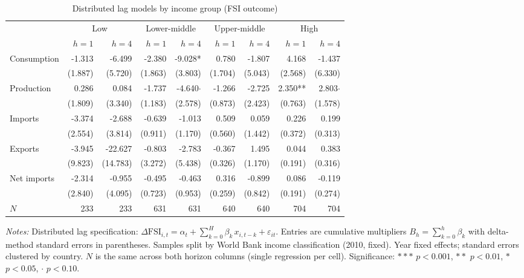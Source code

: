 
\begin{table}[htbp]
\centering
\caption{Distributed lag models by income group (FSI outcome)}
\label{tab:income-dl}
\begin{threeparttable}
\small
\begin{tabular}{l rr rr rr rr}
\toprule
 & \multicolumn{2}{c}{Low} & \multicolumn{2}{c}{Lower-middle} & \multicolumn{2}{c}{Upper-middle} & \multicolumn{2}{c}{High} \\
\cmidrule(lr){2-3} \cmidrule(lr){4-5} \cmidrule(lr){6-7} \cmidrule(lr){8-9}
 & $h=1$ & $h=4$ & $h=1$ & $h=4$ & $h=1$ & $h=4$ & $h=1$ & $h=4$ \\
\midrule
Consumption & -1.313 & -6.499 & -2.380 & -9.028* & 0.780 & -1.807 & 4.168 & -1.437 \\
   & (1.887) & (5.720) & (1.863) & (3.803) & (1.704) & (5.043) & (2.568) & (6.330) \\[4pt]
Production & 0.286 & 0.084 & -1.737 & -4.640$\cdot$ & -1.266 & -2.725 & 2.350** & 2.803$\cdot$ \\
   & (1.809) & (3.340) & (1.183) & (2.578) & (0.873) & (2.423) & (0.763) & (1.578) \\[4pt]
Imports & -3.374 & -2.688 & -0.639 & -1.013 & 0.509 & 0.059 & 0.226 & 0.199 \\
   & (2.554) & (3.814) & (0.911) & (1.170) & (0.560) & (1.442) & (0.372) & (0.313) \\[4pt]
Exports & -3.945 & -22.627 & -0.803 & -2.783 & -0.367 & 1.495 & 0.044 & 0.383 \\
   & (9.823) & (14.783) & (3.272) & (5.438) & (0.326) & (1.170) & (0.191) & (0.316) \\[4pt]
Net imports & -2.314 & -0.955 & -0.495 & -0.463 & 0.316 & -0.899 & 0.086 & -0.119 \\
   & (2.840) & (4.095) & (0.723) & (0.953) & (0.259) & (0.842) & (0.191) & (0.274) \\[4pt]
\midrule
$N$ & 233 & 233 & 631 & 631 & 640 & 640 & 704 & 704 \\
\bottomrule
\end{tabular}
\begin{tablenotes}\small
\item \textit{Notes:} Distributed lag specification: $\Delta\text{FSI}_{i,t} = \alpha_t + \sum_{k=0}^{H}\beta_k\,x_{i,t-k} + \varepsilon_{it}$. Entries are cumulative multipliers $B_h = \sum_{k=0}^{h}\beta_k$ with delta-method standard errors in parentheses. Samples split by World Bank income classification (2010, fixed). Year fixed effects; standard errors clustered by country. $N$ is the same across both horizon columns (single regression per cell). Significance: $***$ $p<0.001$, $**$ $p<0.01$, $*$ $p<0.05$, $\cdot$ $p<0.10$.
\end{tablenotes}
\end{threeparttable}
\end{table}
